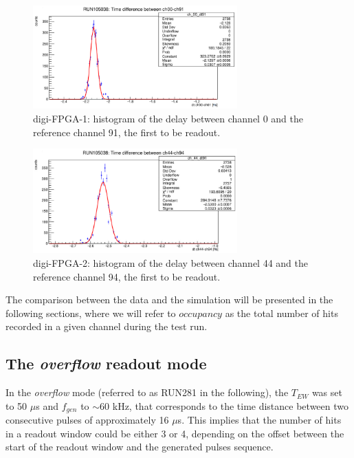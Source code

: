   \begin{figure}[!h]
          \centering
      \includegraphics[width=0.7\textwidth]{figures/png/Screenshot from 2023-12-03 11-50-50.png}
      \caption[Delay between channel 0 and the reference channel in digi-FPGA-1.]{digi-FPGA-1: histogram of the delay between 
      channel 0 and the reference channel 91, the first 
      to be readout.}
      \label{fig:delay1}
    \end{figure}
    \begin{figure}[!h]
          \centering
      \includegraphics[width=0.7\textwidth]{figures/png/Screenshot from 2023-12-03 11-50-33.png}
      \caption[Delay between channel 44 and the reference channel in digi-FPGA-2.]{digi-FPGA-2: histogram of the delay between 
      channel 44 and the reference channel 94, the first 
      to be readout.}
      \label{fig:delay2}
    \end{figure}
   
    The comparison between the data and the simulation 
    will be presented in the following sections, where 
    we will refer to $occupancy$ as the total number of hits 
    recorded in a given channel during the test run.
\subsection{The \textit{overflow} readout mode}
In the \textit{overflow} mode (referred to 
as RUN281 in the following), 
the $T_{EW}$ was set to 50 $\mu$s and $f_{gen}$ to $\sim$60 kHz, that 
corresponds to the time distance between two consecutive pulses of 
approximately 16 $\mu$s.
This implies that the number of hits in a 
readout window could be 
either 3 or 4, depending on the offset 
between the start of the readout window and the generated pulses sequence.
